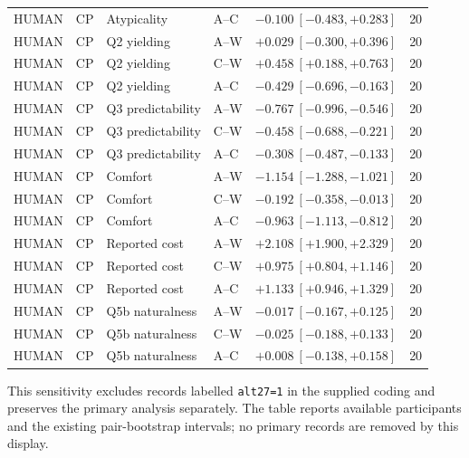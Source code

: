 \begin{longtable}{llllrr}
HUMAN & CP & Atypicality & A--C & $-0.100\ [-0.483,+0.283]$ & 20 \\
HUMAN & CP & Q2 yielding & A--W & $+0.029\ [-0.300,+0.396]$ & 20 \\
HUMAN & CP & Q2 yielding & C--W & $+0.458\ [+0.188,+0.763]$ & 20 \\
HUMAN & CP & Q2 yielding & A--C & $-0.429\ [-0.696,-0.163]$ & 20 \\
HUMAN & CP & Q3 predictability & A--W & $-0.767\ [-0.996,-0.546]$ & 20 \\
HUMAN & CP & Q3 predictability & C--W & $-0.458\ [-0.688,-0.221]$ & 20 \\
HUMAN & CP & Q3 predictability & A--C & $-0.308\ [-0.487,-0.133]$ & 20 \\
HUMAN & CP & Comfort & A--W & $-1.154\ [-1.288,-1.021]$ & 20 \\
HUMAN & CP & Comfort & C--W & $-0.192\ [-0.358,-0.013]$ & 20 \\
HUMAN & CP & Comfort & A--C & $-0.963\ [-1.113,-0.812]$ & 20 \\
HUMAN & CP & Reported cost & A--W & $+2.108\ [+1.900,+2.329]$ & 20 \\
HUMAN & CP & Reported cost & C--W & $+0.975\ [+0.804,+1.146]$ & 20 \\
HUMAN & CP & Reported cost & A--C & $+1.133\ [+0.946,+1.329]$ & 20 \\
HUMAN & CP & Q5b naturalness & A--W & $-0.017\ [-0.167,+0.125]$ & 20 \\
HUMAN & CP & Q5b naturalness & C--W & $-0.025\ [-0.188,+0.133]$ & 20 \\
HUMAN & CP & Q5b naturalness & A--C & $+0.008\ [-0.138,+0.158]$ & 20 \\
\end{longtable}
\endgroup


This sensitivity excludes records labelled \texttt{alt27=1} in the supplied coding and preserves the primary analysis separately. The table reports available participants and the existing pair-bootstrap intervals; no primary records are removed by this display.

